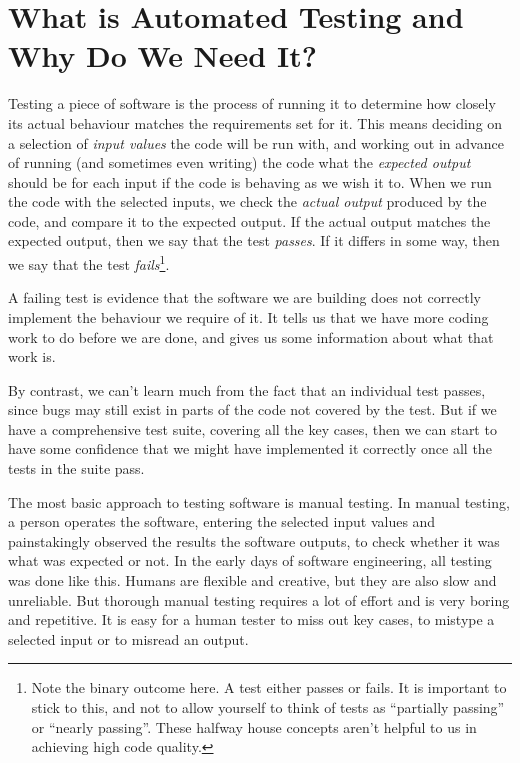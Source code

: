 \documentclass[
]{book}
\begin{document}
\hypertarget{automated-test}{%
\section{What is Automated Testing and Why Do We Need It?}\label{automated-test}}

Testing a piece of software is the process of running it to determine how closely its actual behaviour matches the requirements set for it. This means deciding on a selection of \emph{input values} the code will be run with, and working out in advance of running (and sometimes even writing) the code what the \emph{expected output} should be for each input if the code is behaving as we wish it to. When we run the code with the selected inputs, we check the \emph{actual output} produced by the code, and compare it to the expected output. If the actual output matches the expected output, then we say that the test \emph{passes}. If it differs in some way, then we say that the test \emph{fails}\footnote{Note the binary outcome here. A test either passes or fails. It is important to stick to this, and not to allow yourself to think of tests as ``partially passing'' or ``nearly passing''. These halfway house concepts aren't helpful to us in achieving high code quality.}.

A failing test is evidence that the software we are building does not correctly implement the behaviour we require of it. It tells us that we have more coding work to do before we are done, and gives us some information about what that work is.

By contrast, we can't learn much from the fact that an individual test passes, since bugs may still exist in parts of the code not covered by the test. But if we have a comprehensive test suite, covering all the key cases, then we can start to have some confidence that we might have implemented it correctly once all the tests in the suite pass.

The most basic approach to testing software is manual testing. In manual testing, a person operates the software, entering the selected input values and painstakingly observed the results the software outputs, to check whether it was what was expected or not. In the early days of software engineering, all testing was done like this. Humans are flexible and creative, but they are also slow and unreliable. But thorough manual testing requires a lot of effort and is very boring and repetitive. It is easy for a human tester to miss out key cases, to mistype a selected input or to misread an output.
\end{document}
